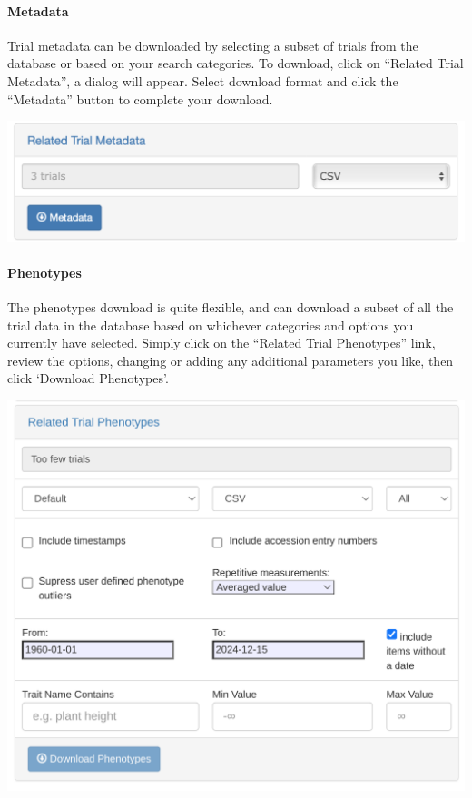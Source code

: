 \documentclass[
  12pt,
]{book}
\begin{document}
\hypertarget{metadata}{%
\paragraph*{Metadata}\label{metadata}}

Trial metadata can be downloaded by selecting a subset of trials from the database or based on your search categories. To download, click on ``Related Trial Metadata'', a dialog will appear. Select download format and click the ``Metadata'' button to complete your download.

\begin{center}\includegraphics[width=0.75\linewidth]{assets/images/wizard_related_metadata_download} \end{center}

\hypertarget{phenotypes}{%
\paragraph*{Phenotypes}\label{phenotypes}}

The phenotypes download is quite flexible, and can download a subset of all the trial data in the database based on whichever categories and options you currently have selected. Simply click on the ``Related Trial Phenotypes'' link, review the options, changing or adding any additional parameters you like, then click `Download Phenotypes'.

\begin{center}\includegraphics[width=0.75\linewidth]{assets/images/wizard_related_phenotypes_download} \end{center}
\end{document}
